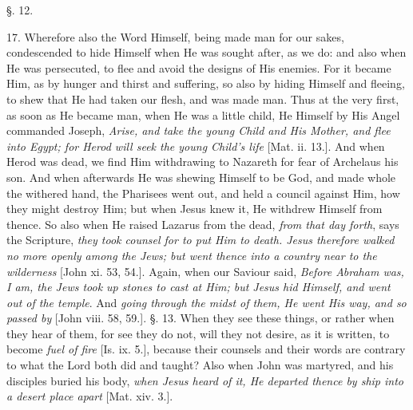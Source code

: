§. 12.

17. Wherefore also the Word Himself, being made
man for our sakes, condescended to hide Himself when He was sought
after, as we do: and also when He was persecuted, to flee and avoid
the designs of His enemies. For it became Him, as by hunger and
thirst and suffering, so also by hiding Himself and fleeing, to shew
that He had taken our flesh, and was made man. Thus at the very first,
as soon as He became man, when He was a little child, He Himself by
His Angel commanded Joseph, \emph{Arise, and take the young Child and His
Mother, and flee into Egypt; for Herod will seek the young Child's
life} [Mat. ii. 13.]. And when Herod was dead, we find Him
withdrawing to Nazareth for fear of Archelaus his son. And when
afterwards He was shewing Himself to be God, and made whole the
withered hand, the Pharisees went out, and held a council against Him,
how they might destroy Him; but when Jesus knew it, He withdrew
Himself from thence. So also when He raised Lazarus from the dead, \emph{from
that day forth}, says the Scripture, \emph{they took counsel for to
put Him to death. Jesus therefore walked no more openly among the
Jews; but went thence into a country near to the wilderness} [John
xi. 53, 54.]. Again, when our Saviour said, \emph{Before Abraham was, I
am, the Jews took up stones to cast at Him; but Jesus hid Himself, and
went out of the temple}. And \emph{going through the midst of them, He
went His way, and so passed by} [John viii. 58, 59.]. §. 13. When
they see these things, or rather when they hear of them, for see they
do not, will they not desire, as it is written, to become \emph{fuel of
fire} [Is. ix. 5.], because their counsels and their words are
contrary to what the Lord both did and taught? Also when John was
martyred, and his disciples buried his body, \emph{when Jesus heard of
it, He departed thence by ship into a desert place apart} [Mat.
xiv. 3.].

